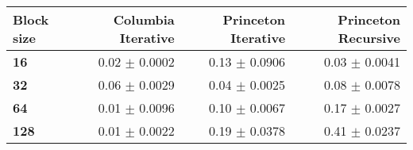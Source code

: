 \begin{tabular}{lrrr}\toprule
\textbf{Block size}  & \textbf{Columbia Iterative} & \textbf{Princeton Iterative} & \textbf{Princeton Recursive}\\\midrule
\textbf{16}  & 0.02 $\pm$ 0.0002 & 0.13 $\pm$ 0.0906 & 0.03 $\pm$ 0.0041\\
\textbf{32}  & 0.06 $\pm$ 0.0029 & 0.04 $\pm$ 0.0025 & 0.08 $\pm$ 0.0078\\
\textbf{64}  & 0.01 $\pm$ 0.0096 & 0.10 $\pm$ 0.0067 & 0.17 $\pm$ 0.0027\\
\textbf{128} & 0.01 $\pm$ 0.0022 & 0.19 $\pm$ 0.0378 & 0.41 $\pm$ 0.0237\\
\bottomrule
\end{tabular}
